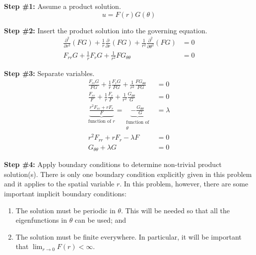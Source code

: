\vspace{0.25cm}

\noindent\textbf{Step \#1:} Assume a product solution.
\begin{equation*}
u = F(r)G(\theta) 
\end{equation*}

\vspace{0.25cm}

\noindent\textbf{Step \#2:} Insert the product solution into the governing equation.  
\begin{align*}
\frac{\partial^2}{\partial r^2}(FG) + \frac{1}{r}\frac{\partial}{\partial r}(FG) + \frac{1}{r^2}\frac{\partial^2}{\partial \theta^2}(FG) &=0 \\
F_{rr}G + \frac{1}{r}F_rG + \frac{1}{r^2}FG_{\theta \theta} &= 0
\end{align*}

\vspace{0.25cm}

\noindent\textbf{Step \#3:} Separate variables.
\begin{align*}
\frac{F_{rr}G}{FG} + \frac{1}{r}\frac{F_rG}{FG} + \frac{1}{r^2}\frac{FG_{\theta \theta}}{FG} &= 0 \\
\frac{F_{rr}}{F} + \frac{1}{r}\frac{F_r}{F} + \frac{1}{r^2}\frac{G_{\theta \theta}}{G} &= 0 \\
\underbrace{\frac{r^2 F_{rr} + r F_r}{F}}_{\text{function of } r} = \underbrace{-\frac{G_{\theta \theta}}{G}}_{\substack{\text{function of} \\ \theta}} &= \lambda \\
r^2 F_{rr} + r F_{r} - \lambda F &= 0 \\
G_{\theta \theta} + \lambda G &= 0
\end{align*}

\vspace{4.0cm}

\noindent\textbf{Step \#4:} Apply boundary conditions to determine non-trivial product solution(s).  There is only one boundary condition explicitly given in this problem and it applies to the spatial variable $r$.  In this problem, however, there are some important implicit boundary conditions:
\begin{enumerate}
\item The solution must be periodic in $\theta$. This will be needed so that all the eigenfunctions in $\theta$ can be used; and
\item The solution must be finite everywhere.  In particular, it will be important that $\lim_{r\to 0} F(r) < \infty$.  
\end{enumerate}

